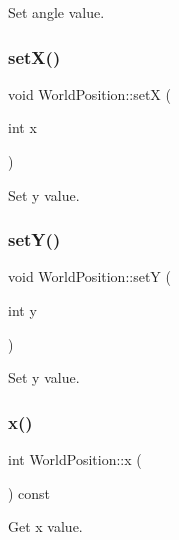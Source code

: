 Set angle value. 

\mbox{\label{class_world_position_a51676af1df78205bdfb48237ae91d935}} 
\subsubsection{\texorpdfstring{setX()}{setX()}}
{\footnotesize\ttfamily void World\+Position\+::setX (\begin{DoxyParamCaption}\item[{int}]{x }\end{DoxyParamCaption})}



Set y value. 

\mbox{\label{class_world_position_abfae710277c596fc57fdd9fefaac1190}} 
\subsubsection{\texorpdfstring{setY()}{setY()}}
{\footnotesize\ttfamily void World\+Position\+::setY (\begin{DoxyParamCaption}\item[{int}]{y }\end{DoxyParamCaption})}



Set y value. 

\mbox{\label{class_world_position_a76a7d3f5ce6324d8fff2e34d6759c77e}} 
\subsubsection{\texorpdfstring{x()}{x()}}
{\footnotesize\ttfamily int World\+Position\+::x (\begin{DoxyParamCaption}{ }\end{DoxyParamCaption}) const}



Get x value. 

\mbox{\label{class_world_position_a27974b894b7f7ccc25ed8c27b05c79ac}} 
